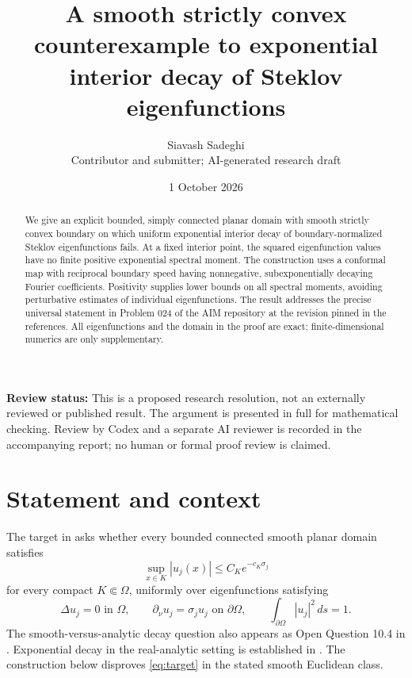 \documentclass[11pt]{article}
\title{A smooth strictly convex counterexample to exponential interior decay of Steklov eigenfunctions}
\author{Siavash Sadeghi\\{\small Contributor and submitter; AI-generated research draft}}
\date{1 October 2026}
\theoremstyle{remark}
\begin{document}
\maketitle
\begin{center}
\small\textbf{Review status:} This is a proposed research resolution, not an externally reviewed or published result. The argument is presented in full for mathematical checking. Review by Codex and a separate AI reviewer is recorded in the accompanying report; no human or formal proof review is claimed.
\end{center}
\begin{abstract}
We give an explicit bounded, simply connected planar domain with smooth strictly convex boundary on which uniform exponential interior decay of boundary-normalized Steklov eigenfunctions fails. At a fixed interior point, the squared eigenfunction values have no finite positive exponential spectral moment. The construction uses a conformal map with reciprocal boundary speed having nonnegative, subexponentially decaying Fourier coefficients. Positivity supplies lower bounds on all spectral moments, avoiding perturbative estimates of individual eigenfunctions. The result addresses the precise universal statement in Problem 024 of the AIM repository at the revision pinned in the references. All eigenfunctions and the domain in the proof are exact; finite-dimensional numerics are only supplementary.
\end{abstract}

\section{Statement and context}
The target in \cite{catalog} asks whether every bounded connected smooth planar domain satisfies
\begin{equation}\label{eq:target}
 \sup_{x\in K}|u_j(x)|\leq C_K e^{-c_K\sigma_j}
\end{equation}
for every compact $K\Subset\Omega$, uniformly over eigenfunctions satisfying
\[
 \Delta u_j=0\text{ in }\Omega,\qquad
 \partial_\nu u_j=\sigma_j u_j\text{ on }\partial\Omega,\qquad
 \int_{\partial\Omega}|u_j|^2\,ds=1.
\]
The smooth-versus-analytic decay question also appears as Open Question 10.4 in \cite{survey}. Exponential decay in the real-analytic setting is established in \cite{GT}. The construction below disproves \eqref{eq:target} in the stated smooth Euclidean class.
\end{document}
